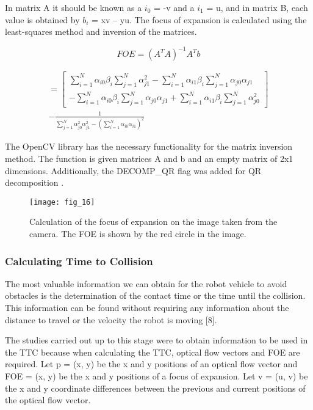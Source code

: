 \documentclass[twocolumn, switch]{article} %
\begin{document}
In matrix A it should be known as a $i_0$ = -v and a $i_1$ = u, and
in matrix B, each value is obtained by $b_i$ = xv – yu. The focus
of expansion is calculated using the least-squares method
and inversion of the matrices.

\begin{equation}
	FOE=(A^TA)^{-1}A^Tb
\end{equation}

\begin{equation}
\begin{split}
=\begin{bmatrix}
		\sum _{i=1}^{N} \alpha _{i0}\beta _{i}\sum _{j=1}^{N} \alpha _{j1}^2 - \sum _{i=1}^{N} \alpha _{i1}\beta _{i}\sum _{j=1}^{N} \alpha _{j0}\alpha _{j1}\\
		- \sum _{i=1}^{N} \alpha _{i0}\beta _{i}\sum _{j=1}^{N} \alpha _{j0}\alpha _{j1} + \sum _{i=1}^{N} \alpha _{i1}\beta _{i}\sum _{j=1}^{N} \alpha _{j0}^2 \end{bmatrix}\\
- \frac{1}{\sum _{j=1}^{N} \alpha _{j0}^2\alpha _{j1}^2 - (\sum _{i=1}^{N} \alpha _{i0}\alpha _{i1})^2}
\end{split}
\end{equation}

The OpenCV library has the necessary functionality for the
matrix inversion method. The function is given matrices A
and b and an empty matrix of 2x1 dimensions. Additionally,
the DECOMP\_QR flag was added for QR decomposition \cite{gander1980algorithms}.

\begin{figure}[h]
    \centering
    \texttt{[image: fig\_16]}
    \caption{Calculation of the focus of expansion on the image
taken from the camera. The FOE is shown by the red circle
in the image.}
    \label{fig:fig16}
\end{figure}

\subsubsection{Calculating Time to Collision}

The most valuable information we can obtain for the robot
vehicle to avoid obstacles is the determination of the contact
time or the time until the collision. This information can be
found without requiring any information about the distance
to travel or the velocity the robot is moving [8].

The studies carried out up to this stage were to obtain
information to be used in the TTC because when calculating
the TTC, optical flow vectors and FOE are required. Let p =
(x, y) be the x and y positions of an optical flow vector and
FOE = (x, y) be the x and y positions of a focus of expansion.
Let v = (u, v) be the x and y coordinate differences between
the previous and current positions of the optical flow vector.
\end{document}

